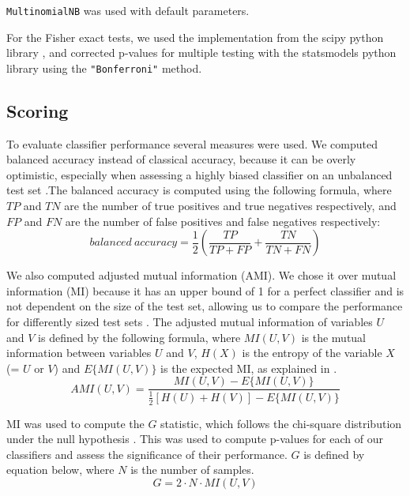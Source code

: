 \documentclass[
  11pt,
  twoside]{scrbook}
\begin{document}
\texttt{MultinomialNB} was used with default parameters.

For the Fisher exact tests, we used the implementation from the scipy python library \autocite{virtanenSciPyFundamentalAlgorithms2020}, and corrected p-values for multiple testing with the statsmodels python library \autocite{seaboldStatsmodelsEconometricStatistical2010} using the \texttt{"Bonferroni"} method.

\hypertarget{scoring}{%
\subsection{Scoring}\label{scoring}}

To evaluate classifier performance several measures were used. We computed balanced accuracy instead of classical accuracy, because it can be overly optimistic, especially when assessing a highly biased classifier on an unbalanced test set \autocite{brodersenBalancedAccuracyIts2010}.The balanced accuracy is computed using the following formula, where \(TP\) and \(TN\) are the number of true positives and true negatives respectively, and \(FP\) and \(FN\) are the number of false positives and false negatives respectively:\\
\[
balanced~accuracy = \frac{1}{2}\left(
      \frac{TP}{TP + FP} + \frac{TN}{TN + FN}
  \right)
\]

We also computed adjusted mutual information (AMI). We chose it over mutual information (MI) because it has an upper bound of 1 for a perfect classifier and is not dependent on the size of the test set, allowing us to compare the performance for differently sized test sets \autocite{vinhInformationTheoreticMeasures2010}. The adjusted mutual information of variables \(U\) and \(V\) is defined by the following formula, where \(MI(U,V)\) is the mutual information between variables \(U\) and \(V\), \(H(X)\) is the entropy of the variable \(X\) (= \(U\) or \(V\)) and \(E\{MI(U,V)\}\) is the expected MI, as explained in \autocite{vinhNovelApproachAutomatic2009}.\\
\[
AMI(U,V) = \frac{
      MI(U,V) - E\{MI(U,V)\} 
  }{
      \frac{1}{2}[H(U) + H(V)] - E\{MI(U,V)\}
  }
\]

MI was used to compute the \(G\) statistic, which follows the chi-square distribution under the null hypothesis \autocite{harremoesMutualInformationContingency2014}. This was used to compute p-values for each of our classifiers and assess the significance of their performance. \(G\) is defined by equation below, where \(N\) is the number of samples.\\
\[G = 2\cdot N \cdot MI(U,V)\]
\end{document}
